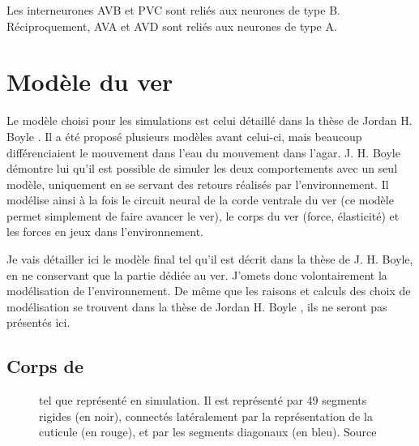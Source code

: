 Les interneurones AVB et PVC sont reliés aux neurones de type B. Réciproquement, AVA et AVD
sont reliés aux neurones de type A.




\section{Modèle du ver} %
\label{sec:Modèle du ver}

Le modèle choisi pour les simulations est celui détaillé dans la thèse de
Jordan H. Boyle \cite{Boyle2009}. Il a été proposé plusieurs modèles avant
celui-ci, mais beaucoup différenciaient le mouvement dans l'eau du mouvement
dans l'agar. J. H. Boyle démontre lui qu'il est possible de simuler les deux
comportements avec un seul modèle, uniquement en se servant des retours
réalisés par l'environnement. Il modélise ainsi à la fois le circuit neural de
la corde ventrale du ver (ce modèle permet simplement de faire avancer le ver),
le corps du ver (force, élasticité) et les forces en jeux dans l'environnement.

Je vais détailler ici le modèle final tel qu'il est décrit dans la thèse de J.
H. Boyle, en ne conservant que la partie dédiée au ver. J'omets donc
volontairement la modélisation de l'environnement. De même que les raisons et
calculs des choix de modélisation se trouvent dans la thèse de Jordan H. Boyle
\cite{Boyle2009}, ils ne seront pas présentés ici.\\

\subsection{Corps de \celeg{}} %
\label{sub:Corps de celeg}

\begin{figure}[ht]
   \begin{center}
   \end{center}
   \caption[Représentation de \celeg{} en simulation]{\celeg{} tel que représenté en simulation. Il est représenté
   par 49 segments rigides (en noir), connectés latéralement par la représentation
   de la cuticule (en rouge), et par les segments diagonaux (en bleu). Source \boylecite{}}
   \label{fig:celegans_representation}
\end{figure}

